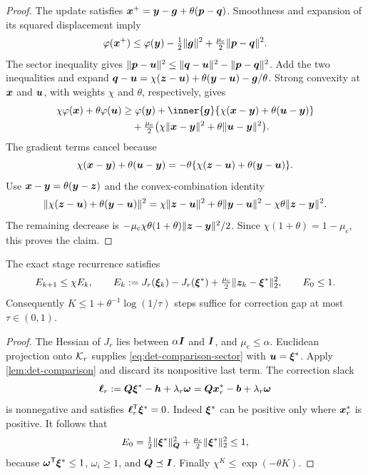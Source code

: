 \begin{proof}
The update satisfies $\bm{x}^+=\bm{y}-\bm{g}+\theta(\bm{p}-\bm{q})$.
Smoothness and expansion of its squared displacement imply
\[
 \varphi(\bm{x}^+)\leq\varphi(\bm{y})-\tfrac12\lVert\bm{g}\rVert^2
                     +\tfrac{\mu_{\mathrm{c}}}2\lVert\bm{p}-\bm{q}\rVert^2.
\]
The sector inequality gives
$\lVert\bm{p}-\bm{u}\rVert^2\leq\lVert\bm{q}-\bm{u}\rVert^2-\lVert\bm{p}-\bm{q}\rVert^2$.
Add the two inequalities and expand
$\bm{q}-\bm{u}=\chi(\bm{z}-\bm{u})+\theta(\bm{y}-\bm{u})-\bm{g}/\theta$.
Strong convexity at $\bm{x}$ and $\bm{u}$, with weights $\chi$ and $\theta$,
respectively, gives
\begin{align*}
 \chi\varphi(\vx)+\theta\varphi(\vu)
 &\geq\varphi(\vy)
    +\inner{\vg}{\chi(\vx-\vy)+\theta(\vu-\vy)}\\
 &\quad+\tfrac{\mu_{\mathrm{c}}}2
       \bigl(\chi\norm{\vx-\vy}^2+\theta\norm{\vu-\vy}^2\bigr).
\end{align*}
The gradient terms cancel because
\[
 \chi(\bm{x}-\bm{y})+\theta(\bm{u}-\bm{y})
 =-\theta\{\chi(\bm{z}-\bm{u})+\theta(\bm{y}-\bm{u})\}.
\]
Use $\bm{x}-\bm{y}=\theta(\bm{y}-\bm{z})$ and the convex-combination identity
\[
 \lVert\chi(\bm{z}-\bm{u})+\theta(\bm{y}-\bm{u})\rVert^2
 =\chi\lVert\bm{z}-\bm{u}\rVert^2+\theta\lVert\bm{y}-\bm{u}\rVert^2
       -\chi\theta\lVert\bm{z}-\bm{y}\rVert^2.
\]
The remaining decrease is
$-\mu_{\mathrm{c}}\chi\theta(1+\theta)\lVert\bm{z}-\bm{y}\rVert^2/2$.
Since $\chi(1+\theta)=1-\mu_{\mathrm{c}}$, this proves the claim.
\end{proof}

\begin{proposition}
\label{prop:det-stage-rate}
The exact stage recurrence satisfies
\begin{equation}
 E_{k+1}\leq\chi E_k,\qquad
 E_k:=J_r(\bm{\xi}_k)-J_r(\bm{\xi}^*)
          +\tfrac{\mu_{\mathrm{c}}}2\lVert\bm{z}_k-\bm{\xi}^*\rVert_2^2,
 \qquad E_0\leq1.
 \label{eq:det-first-energy}
\end{equation}
Consequently $K\leq1+\theta^{-1}\log(1/\tau)$ steps suffice for
correction gap at most $\tau\in(0,1)$.
\end{proposition}
\begin{proof}
The Hessian of $J_r$ lies between $\alpha\bm{I}$ and $\bm{I}$, and
$\mu_{\mathrm{c}}\leq\alpha$. Euclidean projection onto $\mathcal{K}_r$ supplies
\cref{eq:det-comparison-sector} with $\bm{u}=\bm{\xi}^*$.
Apply \cref{lem:det-comparison} and discard its nonpositive last term.
The correction slack
\begin{equation*}
 \bm{\ell}_r:=\bm{Q}\bm{\xi}^*-\bm{h}+\lambda_r\bm{\omega}
         =\bm{Q}\bm{x}_r^*-\bm{b}+\lambda_r\bm{\omega}
\end{equation*}
is nonnegative and satisfies $\bm{\ell}_r^{\mathsf{T}}\bm{\xi}^*=0$.
Indeed $\bm{\xi}^*$ can be positive only where $\bm{x}_r^*$ is positive.
It follows that
\[
 E_0=\tfrac12\lVert\bm{\xi}^*\rVert_{\bm{Q}}^2
               +\tfrac{\mu_{\mathrm{c}}}2\lVert\bm{\xi}^*\rVert_2^2\leq1,
\]
because $\bm{\omega}^{\mathsf{T}}\bm{\xi}^*\leq1$, $\omega_i\geq1$, and
$\bm{Q}\preceq\bm{I}$. Finally $\chi^K\leq\exp(-\theta K)$.
\end{proof}

